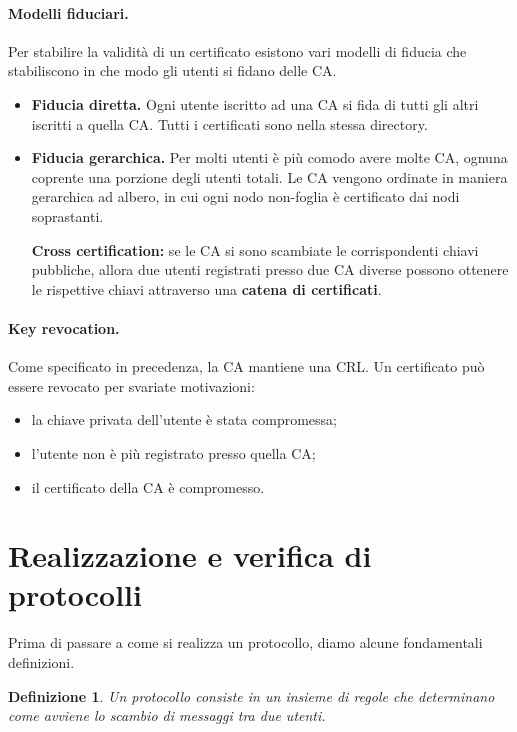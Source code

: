 \documentclass[a4paper, 11pt, twoside]{article}
\newtheorem{definit}{Definizione}[subsection]
\begin{document}
    \paragraph{Modelli fiduciari.}
    Per stabilire la validità di un certificato esistono vari modelli di fiducia che stabiliscono in che modo gli utenti si fidano delle CA.

    \begin{itemize}
        \item \textbf{Fiducia diretta.} Ogni utente iscritto ad una CA si fida di tutti gli altri iscritti a quella CA. Tutti i certificati sono nella stessa directory.
        
        \item \textbf{Fiducia gerarchica.} Per molti utenti è più comodo avere molte CA, ognuna coprente una porzione degli utenti totali. Le CA vengono ordinate in maniera gerarchica ad albero, in cui ogni nodo non-foglia è certificato dai nodi soprastanti.

        \textbf{Cross certification:} se le CA si sono scambiate le corrispondenti chiavi pubbliche, allora due utenti registrati presso due CA diverse possono ottenere le rispettive chiavi attraverso una \textbf{catena di certificati}.
    \end{itemize}

    
    \paragraph{Key revocation.}
    Come specificato in precedenza, la CA mantiene una CRL. Un certificato può essere revocato per svariate motivazioni: \begin{itemize}
        \item la chiave privata dell'utente è stata compromessa;
        \item l'utente non è più registrato presso quella CA;
        \item il certificato della CA è compromesso.
    \end{itemize}

    \section{Realizzazione e verifica di protocolli}
    Prima di passare a come si realizza un protocollo, diamo alcune fondamentali definizioni.
    \begin{definit}
        Un protocollo consiste in un insieme di regole che determinano come avviene lo scambio di messaggi tra due utenti.
    \end{definit}
\end{document}
